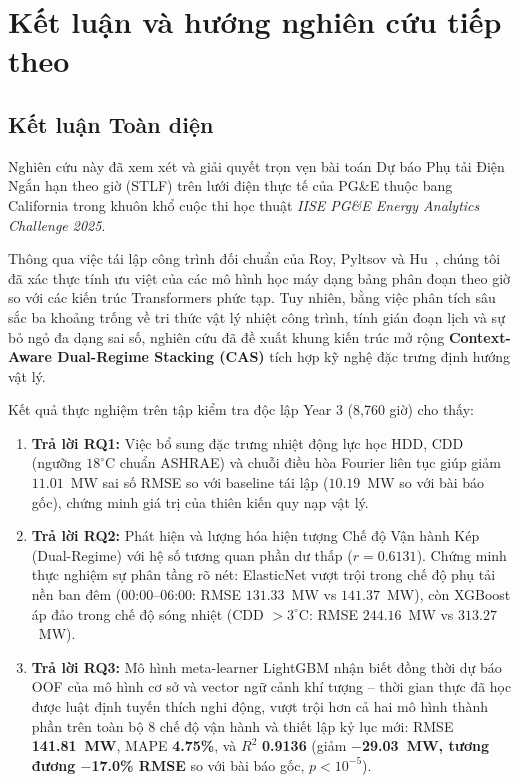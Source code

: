 \section{Kết luận và hướng nghiên cứu tiếp theo}
\label{sec:conclusion_and_future_work}

\subsection{Kết luận Toàn diện}
Nghiên cứu này đã xem xét và giải quyết trọn vẹn bài toán Dự báo Phụ tải Điện Ngắn hạn theo giờ (STLF) trên lưới điện thực tế của PG\&E thuộc bang California trong khuôn khổ cuộc thi học thuật \textit{IISE PG\&E Energy Analytics Challenge 2025}. 

Thông qua việc tái lập công trình đối chuẩn của Roy, Pyltsov và Hu~\cite{roy2025hourly}, chúng tôi đã xác thực tính ưu việt của các mô hình học máy dạng bảng phân đoạn theo giờ so với các kiến trúc Transformers phức tạp. Tuy nhiên, bằng việc phân tích sâu sắc ba khoảng trống về tri thức vật lý nhiệt công trình, tính gián đoạn lịch và sự bỏ ngỏ đa dạng sai số, nghiên cứu đã đề xuất khung kiến trúc mở rộng \textbf{Context-Aware Dual-Regime Stacking (CAS)} tích hợp kỹ nghệ đặc trưng định hướng vật lý. 

Kết quả thực nghiệm trên tập kiểm tra độc lập Year 3 (8,760 giờ) cho thấy:
\begin{enumerate}
    \item \textbf{Trả lời RQ1:} Việc bổ sung đặc trưng nhiệt động lực học HDD, CDD (ngưỡng $18^\circ\text{C}$ chuẩn ASHRAE) và chuỗi điều hòa Fourier liên tục giúp giảm $11.01$~MW sai số RMSE so với baseline tái lập ($10.19$~MW so với bài báo gốc), chứng minh giá trị của thiên kiến quy nạp vật lý.
    \item \textbf{Trả lời RQ2:} Phát hiện và lượng hóa hiện tượng Chế độ Vận hành Kép (Dual-Regime) với hệ số tương quan phần dư thấp ($r = 0.6131$). Chứng minh thực nghiệm sự phân tầng rõ nét: ElasticNet vượt trội trong chế độ phụ tải nền ban đêm (00:00--06:00: RMSE $131.33$~MW vs $141.37$~MW), còn XGBoost áp đảo trong chế độ sóng nhiệt (CDD $> 3^\circ\text{C}$: RMSE $244.16$~MW vs $313.27$~MW).
    \item \textbf{Trả lời RQ3:} Mô hình meta-learner LightGBM nhận biết đồng thời dự báo OOF của mô hình cơ sở và vector ngữ cảnh khí tượng -- thời gian thực đã học được luật định tuyến thích nghi động, vượt trội hơn cả hai mô hình thành phần trên toàn bộ 8 chế độ vận hành và thiết lập kỷ lục mới: RMSE \textbf{141.81~MW}, MAPE \textbf{4.75\%}, và $R^2$ \textbf{0.9136} (giảm \textbf{$-$29.03~MW, tương đương $-$17.0\% RMSE} so với bài báo gốc, $p < 10^{-5}$).
\end{enumerate}

